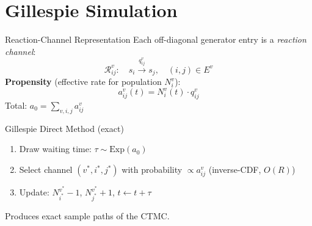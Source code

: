 \documentclass[aspectratio=169,12pt]{beamer}
\begin{document}
\section{Gillespie Simulation}
\begin{frame}{Reaction-Channel Representation}
Each off-diagonal generator entry is a \emph{reaction channel}:
\[
\mathcal{R}^v_{ij}:\quad s_i \xrightarrow{q^v_{ij}} s_j, \quad (i,j)\in E^v
\]
\textbf{Propensity} (effective rate for population $N^v_i$):
\[
a^v_{ij}(t) = N^v_i(t)\cdot q^v_{ij}
\]
Total: $a_0 = \sum_{v,i,j} a^v_{ij}$

\vspace{6pt}
\begin{block}{Gillespie Direct Method (exact)}
\begin{enumerate}
  \item Draw waiting time: $\tau\sim\mathrm{Exp}(a_0)$
  \item Select channel $(v^*,i^*,j^*)$ with probability $\propto a^v_{ij}$ (inverse-CDF, $O(R)$)
  \item Update: $N^{v^*}_{i^*}{-}1$, $N^{v^*}_{j^*}{+}1$, $t\leftarrow t+\tau$
\end{enumerate}
Produces exact sample paths of the CTMC.
\end{block}
\end{frame}
\end{document}
